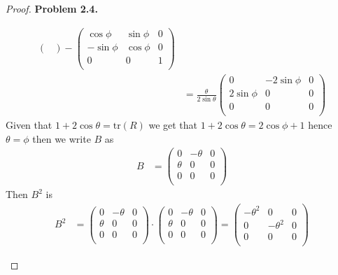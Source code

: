 \documentclass[11pt]{article}
\newcommand{\tr}{\text{tr}}
\theoremstyle{definition}
\begin{document}
\begin{proof}{\textbf{Problem 2.4.}}
\begin{itemize}
\begin{itemize}
\begin{align*}
\begin{pmatrix}
        \end{pmatrix} - \begin{pmatrix}
            \cos\phi & \sin\phi & 0 \\
            -\sin\phi & \cos\phi & 0 \\
            0 & 0 & 1 \\
        \end{pmatrix}\\
        &= \frac{\theta}{2\sin\theta}
         \begin{pmatrix}
            0 & -2\sin\phi & 0 \\
            2\sin\phi & 0 & 0 \\
            0 & 0 & 0 \\
        \end{pmatrix}
    \end{align*}
    Given that $1 + 2\cos\theta = \tr(R)$ we get that
    $1 + 2\cos\theta = 2\cos\phi + 1$ hence $\theta = \phi$ then we write
    $B$ as
    \begin{align*}
        B &= \begin{pmatrix}
            0 & -\theta & 0 \\
            \theta & 0 & 0 \\
            0 & 0 & 0 \\
        \end{pmatrix}
    \end{align*}
    Then $B^2$ is
    \begin{align*}
        B^2 &= \begin{pmatrix}
            0 & -\theta & 0 \\
            \theta & 0 & 0 \\
            0 & 0 & 0 \\
        \end{pmatrix}\cdot \begin{pmatrix}
            0 & -\theta & 0 \\
            \theta & 0 & 0 \\
            0 & 0 & 0 \\
        \end{pmatrix} = \begin{pmatrix}
            -\theta^2 & 0 & 0 \\
            0 & -\theta^2 & 0 \\
            0 & 0 & 0 \\
        \end{pmatrix}
    \end{align*}

\end{itemize}
\end{itemize}
\end{proof}
\end{document}
